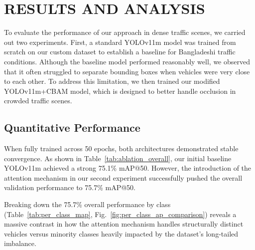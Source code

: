 \documentclass[conference]{IEEEtran}
\begin{document}
\section{RESULTS AND ANALYSIS}
To evaluate the performance of our approach in dense traffic scenes, we carried out two experiments. First, a standard YOLOv11m model was trained from scratch on our custom dataset to establish a baseline for Bangladeshi traffic conditions. Although the baseline model performed reasonably well, we observed that it often struggled to separate bounding boxes when vehicles were very close to each other. To address this limitation, we then trained our modified YOLOv11m+CBAM model, which is designed to better handle occlusion in crowded traffic scenes.

\subsection{Quantitative Performance}
When fully trained across 50 epochs, both architectures demonstrated stable convergence. As shown in Table~\ref{tab:ablation_overall}, our initial baseline YOLOv11m achieved a strong 75.1\% mAP@50. However, the introduction of the attention mechanism in our second experiment successfully pushed the overall validation performance to 75.7\% mAP@50.


\begin{table}[htbp]
\caption{Overall Performance Comparison}
\centering
{}
\label{tab:ablation_overall}
\end{table}


Breaking down the 75.7\% overall performance by class (Table~\ref{tab:per_class_map}, Fig.~\ref{fig:per_class_ap_comparison}) reveals a massive contrast in how the attention mechanism handles structurally distinct vehicles versus minority classes heavily impacted by the dataset's long-tailed imbalance.
\end{document}
